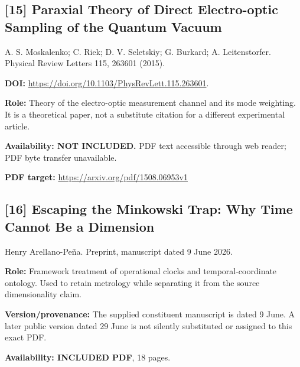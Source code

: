 \documentclass[11pt,a4paper]{article}
\begin{document}
\begin{minipage}{\textwidth}
\subsection*{[15] Paraxial Theory of Direct Electro-optic Sampling of the Quantum Vacuum}
A. S. Moskalenko; C. Riek; D. V. Seletskiy; G. Burkard; A. Leitenstorfer. Physical Review Letters 115, 263601 (2015).

\textbf{DOI:} \url{https://doi.org/10.1103/PhysRevLett.115.263601}.

\textbf{Role:} Theory of the electro-optic measurement channel and its mode weighting. It is a theoretical paper, not a substitute citation for a different experimental article.

\textbf{Availability: NOT INCLUDED.} PDF text accessible through web reader; PDF byte transfer unavailable.\par
\textbf{PDF target:} \url{https://arxiv.org/pdf/1508.06953v1}
\end{minipage}
\par\medskip
\begin{minipage}{\textwidth}
\subsection*{[16] Escaping the Minkowski Trap: Why Time Cannot Be a Dimension}
Henry Arellano-Pe\~na. Preprint, manuscript dated 9 June 2026.

\textbf{Role:} Framework treatment of operational clocks and temporal-coordinate ontology. Used to retain metrology while separating it from the source dimensionality claim.

\textbf{Version/provenance:} The supplied constituent manuscript is dated 9 June. A later public version dated 29 June is not silently substituted or assigned to this exact PDF.

\textbf{Availability: INCLUDED PDF}, 18 pages.\par
{}
\end{minipage}
\par\medskip
\end{document}
